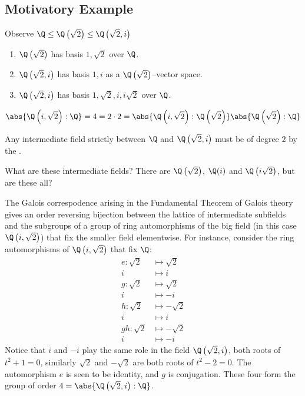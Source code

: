 \documentclass{article}
\begin{document}
\subsection{Motivatory Example}
Observe $\Q \leq \Q\left(\sqrt{2}\right) \leq \Q\left(\sqrt{2}, i\right)$
\begin{enumerate}[label=(\roman*)]
    \item $\Q\left(\sqrt{2}\right)$ has basis $1, \sqrt{2}$ over $\Q$.
    \item $\Q\left(\sqrt{2}, i\right)$ has basis $1, i$ as a $\Q\left(\sqrt{2}\right)$--vector space.
    \item $\Q\left(\sqrt{2}, i\right)$ has basis $1, \sqrt{2}, i, i\sqrt{2}$ over $\Q$.
\end{enumerate}
\begin{equation*}
    \abs{\Q\left(i, \sqrt{2}\right):\Q} = 4 = 2 \cdot 2 = \abs{\Q\left(i, \sqrt{2}\right) : \Q\left(\sqrt{2}\right)} \abs{\Q\left(\sqrt{2}\right):\Q}
\end{equation*}

Any intermediate field strictly between $\Q$ and $\Q\left(\sqrt{2}, i\right)$ must be of degree $2$ by the .


What are these intermediate fields? There are $\Q\left(\sqrt{2}\right)$, $\Q(i)$ and $\Q\left(i\sqrt{2}\right)$, but are these all?

The Galois correspodence arising in the Fundamental Theorem of Galois theory gives an order reversing bijection between the lattice of intermediate subfields and the subgroups of a group of ring automorphisms of the big field (in this case $\Q\left(i, \sqrt{2}\right)$) that fix the smaller field elementwise.
For instance, consider the ring automorphisms of $\Q\left(i, \sqrt{2}\right)$ that fix $\Q$:
\begin{align*}
    e : \sqrt{2} &\longmapsto \sqrt{2} \\
               i &\longmapsto i \\
    g : \sqrt{2} &\longmapsto \sqrt{2} \\
               i &\longmapsto -i \\
    h : \sqrt{2} &\longmapsto -\sqrt{2} \\
               i &\longmapsto i \\
    gh: \sqrt{2} &\longmapsto -\sqrt{2} \\
               i &\longmapsto -i
\end{align*}
Notice that $i$ and $-i$ play the same role in the field $\Q\left(\sqrt{2}, i\right)$, both roots of $t^2 + 1 = 0$, similarly $\sqrt{2}$ and $-\sqrt{2}$ are both roots of $t^2 - 2 = 0$.  The automorphism $e$ is seen to be identity, and $g$ is conjugation.
These four form the group of order $4 = \abs{\Q\left(\sqrt{2}, i\right) : \Q}$.
\end{document}
